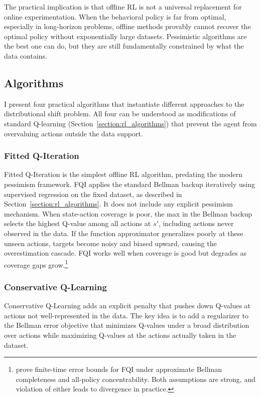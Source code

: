 The practical implication is that offline RL is not a universal replacement for online experimentation. When the behavioral policy is far from optimal, especially in long-horizon problems, offline methods provably cannot recover the optimal policy without exponentially large datasets. Pessimistic algorithms are the best one can do, but they are still fundamentally constrained by what the data contains.

\subsection{Algorithms}
\label{sec:offline_algorithms}

I present four practical algorithms that instantiate different approaches to the distributional shift problem. All four can be understood as modifications of standard Q-learning (Section~\ref{section:rl_algorithms}) that prevent the agent from overvaluing actions outside the data support.

\subsubsection{Fitted Q-Iteration}

Fitted Q-Iteration \citep[FQI,][]{Ernst2005} is the simplest offline RL algorithm, predating the modern pessimism framework. FQI applies the standard Bellman backup iteratively using supervised regression on the fixed dataset, as described in Section~\ref{section:rl_algorithms}. It does not include any explicit pessimism mechanism. When state-action coverage is poor, the max in the Bellman backup selects the highest Q-value among all actions at $s'$, including actions never observed in the data. If the function approximator generalizes poorly at these unseen actions, targets become noisy and biased upward, causing the overestimation cascade. FQI works well when coverage is good but degrades as coverage gaps grow.\footnote{\citet{Munos2008} prove finite-time error bounds for FQI under approximate Bellman completeness and all-policy concentrability. Both assumptions are strong, and violation of either leads to divergence in practice.}

\subsubsection{Conservative Q-Learning}

Conservative Q-Learning \citep[CQL,][]{Kumar2020} adds an explicit penalty that pushes down Q-values at actions not well-represented in the data. The key idea is to add a regularizer to the Bellman error objective that minimizes Q-values under a broad distribution over actions while maximizing Q-values at the actions actually taken in the dataset.

